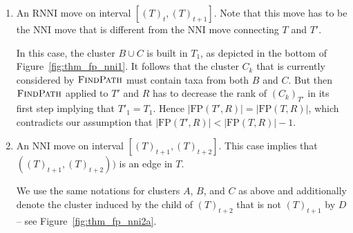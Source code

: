 \documentclass{amsart}
\newcommand{\rnni}{\mathrm{RNNI}}
\newcommand{\findpath}{\textsc{FindPath}}
\newcommand{\nni}{\mathrm{NNI}}
\newcommand{\fp}{\mathrm{FP}}
\begin{document}
\begin{enumerate}[label = 1.{\arabic*}]
\item An $\rnni$ move on interval $[(T)_t, (T)_{t+1}]$.
Note that this move has to be the $\nni$ move that is different from the $\nni$ move connecting $T$ and $T'$.

In this case, the cluster $B \cup C$ is built in $T_1$, as depicted in the bottom of Figure~\ref{fig:thm_fp_nni1}.
It follows that the cluster $C_k$ that is currently considered by $\findpath$ must contain taxa from both $B$ and $C$.
But then $\findpath$ applied to $T'$ and $R$ has to decrease the rank of $(C_k)_{T'}$ in its first step implying that $T'_1 = T_1$.
Hence $|\fp(T',R)| = |\fp(T,R)|$, which contradicts our assumption that $|\fp(T',R)| < |\fp(T,R)| - 1$.

\item An $\nni$ move on interval $[(T)_{t+1}, (T)_{t+2}]$.
This case implies that $((T)_{t+1},(T)_{t+2}))$ is an edge in $T$.

We use the same notations for clusters $A$, $B$, and $C$ as above and additionally denote the cluster induced by the child of $(T)_{t+2}$ that is not $(T)_{t+1}$ by $D$ --
see Figure~\ref{fig:thm_fp_nni2a}.


\end{enumerate}
\end{document}
